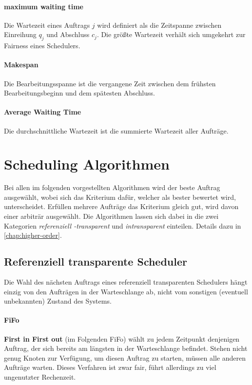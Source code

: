 \paragraph{maximum waiting time}
Die Wartezeit eines Auftrags $j$ wird definiert als die Zeitspanne zwischen Einreihung $q_j$ und Abschluss $c_j$. Die größte Wartezeit verhält sich umgekehrt zur Fairness eines Schedulers.

\paragraph{Makespan}
Die Bearbeitungsspanne ist die vergangene Zeit zwischen dem frühsten Bearbeitungsbeginn und dem spätesten Abschluss.

\paragraph{Average Waiting Time}
Die durchschnittliche Wartezeit ist die summierte Wartezeit aller Aufträge.

\section{Scheduling Algorithmen}
\label{2-schedulers}
Bei allen im folgenden vorgestellten Algorithmen wird der beste Auftrag ausgewählt, wobei sich das Kriterium dafür, welcher als bester bewertet wird, unterscheidet. Erfüllen mehrere Aufträge das Kriterium gleich gut, wird davon einer arbiträr ausgewählt. Die Algorithmen lassen sich dabei in die zwei Kategorien \emph{referenziell -transparent} und \emph{intransparent} einteilen. Details dazu in \ref{chap:higher-order}.

\subsection{Referenziell transparente Scheduler}
Die Wahl des nächsten Auftrags eines referenziell transparenten Schedulers hängt einzig von den Aufträgen in der Warteschlange ab, nicht vom sonstigen (eventuell unbekannten) Zustand des Systems.

\paragraph{FiFo}
\textbf{First in First out} (im Folgenden FiFo) wählt zu jedem Zeitpunkt denjenigen Auftrag, der sich bereits am längsten in der Warteschlange befindet. Stehen nicht genug Knoten zur Verfügung, um diesen Auftrag zu starten, müssen alle anderen Aufträge warten. Dieses Verfahren ist zwar fair, führt allerdings zu viel ungenutzter Rechenzeit.

